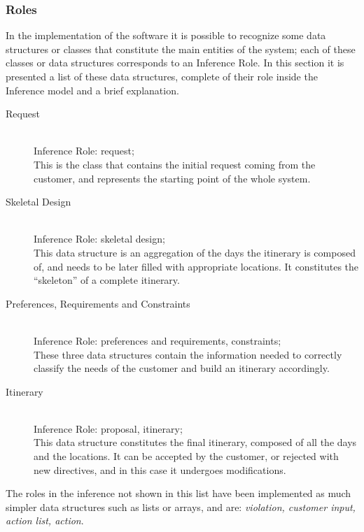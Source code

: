 \documentclass[11pt]{article} %
\begin{document}
\subsubsection{Roles}
In the implementation of the software it is possible to recognize some data structures or classes that constitute the main entities of the system; each of these classes or data structures corresponds to an Inference Role. In this section it is presented a list of these data structures, complete of their role inside the Inference model and a brief explanation.
\begin{description}
\item[Request] \hfill \\
Inference Role: request;\\
This is the class that contains the initial request coming from the customer, and represents the starting point of the whole system.
\item[Skeletal Design] \hfill \\
Inference Role: skeletal design;\\
This data structure is an aggregation of the days the itinerary is composed of, and needs to be later filled with appropriate locations. It constitutes the ``skeleton'' of a complete itinerary.
\item[Preferences, Requirements and Constraints] \hfill \\
Inference Role: preferences and requirements, constraints;\\
These three data structures contain the information needed to correctly classify the needs of the customer and build an itinerary accordingly.
\item[Itinerary] \hfill \\
Inference Role: proposal, itinerary;\\
This data structure constitutes the final itinerary, composed of all the days and the locations. It can be accepted by the customer, or rejected with new directives, and in this case it undergoes modifications.
\end{description}
The roles in the inference not shown in this list have been implemented as much simpler data structures such as lists or arrays, and are: \textit{violation, customer input, action list, action}.
\end{document}
